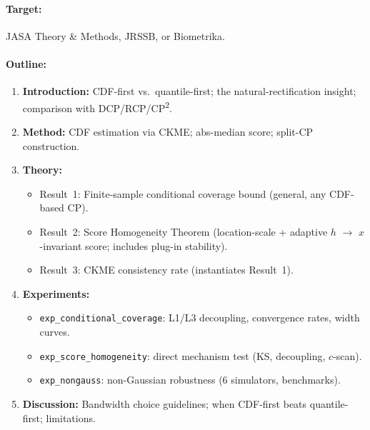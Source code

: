 \documentclass[11pt]{article}
\begin{document}
\paragraph{Target:} JASA Theory \& Methods, JRSSB, or Biometrika.

\paragraph{Outline:}
\begin{enumerate}
  \item \textbf{Introduction:} CDF-first vs.\ quantile-first; the
    natural-rectification insight; comparison with DCP/RCP/CP\textsuperscript{2}.
  \item \textbf{Method:} CDF estimation via CKME; abs-median score;
    split-CP construction.
  \item \textbf{Theory:}
    \begin{itemize}
      \item Result~1: Finite-sample conditional coverage bound
        (general, any CDF-based CP).
      \item Result~2: Score Homogeneity Theorem (location-scale +
        adaptive $h$ $\to$ $x$-invariant score; includes plug-in
        stability).
      \item Result~3: CKME consistency rate (instantiates Result~1).
    \end{itemize}
  \item \textbf{Experiments:}
    \begin{itemize}
      \item \texttt{exp\_conditional\_coverage}: L1/L3 decoupling,
        convergence rates, width curves.
      \item \texttt{exp\_score\_homogeneity}: direct mechanism test
        (KS, decoupling, $c$-scan).
      \item \texttt{exp\_nongauss}: non-Gaussian robustness
        (6 simulators, benchmarks).
    \end{itemize}
  \item \textbf{Discussion:} Bandwidth choice guidelines; when
    CDF-first beats quantile-first; limitations.
\end{enumerate}
\end{document}
